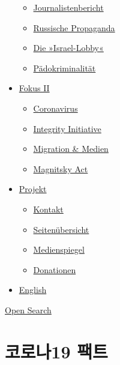 \begin{itemize}
  \begin{itemize}
  \tightlist
  \item
    \href{https://swprs.org/bericht-eines-journalisten/}{Journalistenbericht}
  \item
    \href{https://swprs.org/russische-propaganda/}{Russische Propaganda}
  \item
    \href{https://swprs.org/die-israel-lobby-fakten-und-mythen/}{Die
    »Israel-Lobby«}
  \item
    \href{https://swprs.org/geopolitik-und-paedokriminalitaet/}{Pädokriminalität}
  \end{itemize}
\item
  \href{https://swprs.org/migration-und-medien/}{Fokus II}

  \begin{itemize}
  \tightlist
  \item
    \href{https://swprs.org/covid-19-hinweis-ii/}{Coronavirus}
  \item
    \href{https://swprs.org/die-integrity-initiative/}{Integrity
    Initiative}
  \item
    \href{https://swprs.org/migration-und-medien/}{Migration \& Medien}
  \item
    \href{https://swprs.org/der-fall-magnitsky/}{Magnitsky Act}
  \end{itemize}
\item
  \href{https://swprs.org/kontakt/}{Projekt}

  \begin{itemize}
  \tightlist
  \item
    \href{https://swprs.org/kontakt/}{Kontakt}
  \item
    \href{https://swprs.org/uebersicht/}{Seitenübersicht}
  \item
    \href{https://swprs.org/medienspiegel/}{Medienspiegel}
  \item
    \href{https://swprs.org/donationen/}{Donationen}
  \end{itemize}
\item
  \href{https://swprs.org/contact/}{English}
\end{itemize}

\protect\hyperlink{}{Open Search}

\hypertarget{uxcf54uxb85cuxb09819-uxd329uxd2b8}{%
\section{코로나19 팩트}\label{uxcf54uxb85cuxb09819-uxd329uxd2b8}}

